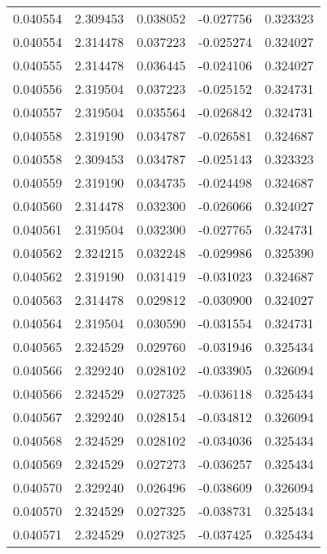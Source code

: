 \begin{tabular}{lrrrr}
0.040554    &  2.309453 &  0.038052 & -0.027756 &             0.323323 \\
0.040554    &  2.314478 &  0.037223 & -0.025274 &             0.324027 \\
0.040555    &  2.314478 &  0.036445 & -0.024106 &             0.324027 \\
0.040556    &  2.319504 &  0.037223 & -0.025152 &             0.324731 \\
0.040557    &  2.319504 &  0.035564 & -0.026842 &             0.324731 \\
0.040558    &  2.319190 &  0.034787 & -0.026581 &             0.324687 \\
0.040558    &  2.309453 &  0.034787 & -0.025143 &             0.323323 \\
0.040559    &  2.319190 &  0.034735 & -0.024498 &             0.324687 \\
0.040560    &  2.314478 &  0.032300 & -0.026066 &             0.324027 \\
0.040561    &  2.319504 &  0.032300 & -0.027765 &             0.324731 \\
0.040562    &  2.324215 &  0.032248 & -0.029986 &             0.325390 \\
0.040562    &  2.319190 &  0.031419 & -0.031023 &             0.324687 \\
0.040563    &  2.314478 &  0.029812 & -0.030900 &             0.324027 \\
0.040564    &  2.319504 &  0.030590 & -0.031554 &             0.324731 \\
0.040565    &  2.324529 &  0.029760 & -0.031946 &             0.325434 \\
0.040566    &  2.329240 &  0.028102 & -0.033905 &             0.326094 \\
0.040566    &  2.324529 &  0.027325 & -0.036118 &             0.325434 \\
0.040567    &  2.329240 &  0.028154 & -0.034812 &             0.326094 \\
0.040568    &  2.324529 &  0.028102 & -0.034036 &             0.325434 \\
0.040569    &  2.324529 &  0.027273 & -0.036257 &             0.325434 \\
0.040570    &  2.329240 &  0.026496 & -0.038609 &             0.326094 \\
0.040570    &  2.324529 &  0.027325 & -0.038731 &             0.325434 \\
0.040571    &  2.324529 &  0.027325 & -0.037425 &             0.325434 \\

\end{tabular}

